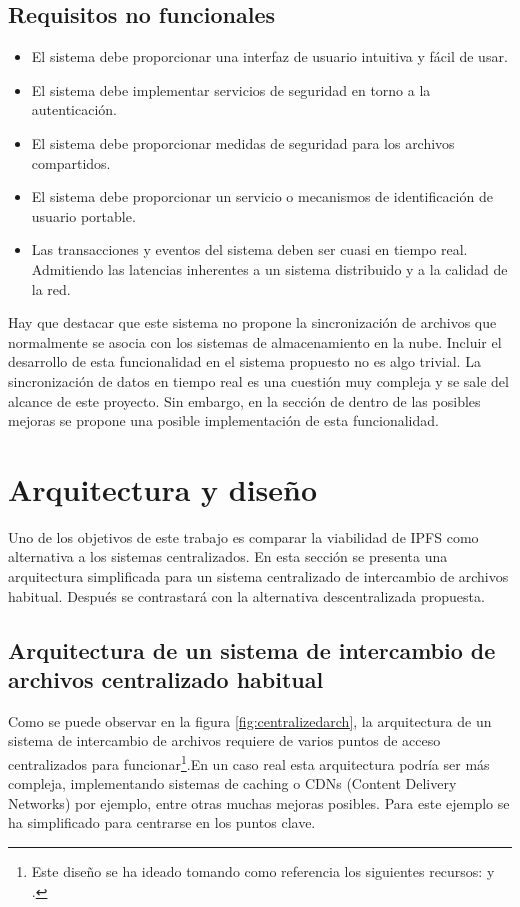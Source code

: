 \subsection{Requisitos no funcionales}
\begin{itemize}[noitemsep,after=\vspace{-0.4\baselineskip}]
  \item El sistema debe proporcionar una interfaz de usuario intuitiva y fácil de usar.
  \item El sistema debe implementar servicios de seguridad en torno a la autenticación.
  \item El sistema debe proporcionar medidas de seguridad para los archivos compartidos.
  \item El sistema debe proporcionar un servicio o mecanismos de identificación de usuario portable.
  \item Las transacciones y eventos del sistema deben ser cuasi en tiempo real. Admitiendo las latencias inherentes a un sistema distribuido y a la calidad de la red.
\end{itemize}
Hay que destacar que este sistema no propone la sincronización de archivos que normalmente se asocia con los sistemas de
almacenamiento en la nube. Incluir el desarrollo de esta funcionalidad en el sistema propuesto no es algo trivial.
La sincronización de datos en tiempo real es una cuestión muy compleja y se sale
del alcance de este proyecto. Sin embargo, en la sección de  dentro de las posibles
mejoras se propone una posible implementación de esta funcionalidad.
\section{Arquitectura y diseño}

Uno de los objetivos de este trabajo es comparar la viabilidad de IPFS como alternativa a los sistemas centralizados.
En esta sección se presenta una arquitectura simplificada para un sistema centralizado de intercambio de archivos habitual.
Después se contrastará con la alternativa descentralizada propuesta.

\subsection{Arquitectura de un sistema de intercambio de archivos centralizado habitual}

Como se puede observar en la figura \ref{fig:centralizedarch}, la arquitectura de un sistema de intercambio de archivos
requiere de varios puntos de acceso centralizados para funcionar\footnote{Este diseño se ha ideado tomando como referencia los siguientes recursos:
  \cite{chakrabortySystemDesignAnalysis2020} y
  \cite{systemdesignSystemDesignInterview2023}.}.En un caso real esta arquitectura podría ser más compleja, implementando sistemas de caching o CDNs (Content Delivery Networks) por ejemplo,
entre otras muchas mejoras posibles. Para este ejemplo se ha simplificado para centrarse en los puntos clave.

